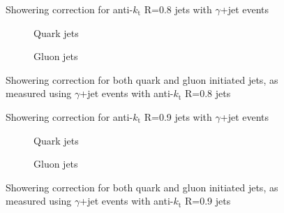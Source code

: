 \clearpage
\begin{figure}[!ht]
 \centering
 \caption[Showering correction for anti-$k_{\mathrm t}$ R=0.8 jets with $\gamma$+jet events]
 {\small Showering correction for anti-$k_{\mathrm t}$ R=0.8 jets with $\gamma$+jet events}
 \label{plot:GJetShowering8App}
\end{figure}

\begin{figure}[!ht]
 \centering
 \begin{subfigure}{.5\textwidth}
  \centering
  \caption{Quark jets}
 \end{subfigure}%
 \begin{subfigure}{.5\textwidth}
  \centering
  \caption{Gluon jets}
 \end{subfigure}
 \caption[Quark/gluon jet showering correction, anti-$k_{\mathrm t}$ R=0.8, $\gamma$+jet]
 {\small Showering correction for both quark and gluon initiated jets, as measured using $\gamma$+jet events with anti-$k_{\mathrm t}$ R=0.8 jets}
 \label{plot:GJetShoweringFlav8App}
\end{figure}

\clearpage
\begin{figure}[!ht]
 \centering
 \caption[Showering correction for anti-$k_{\mathrm t}$ R=0.9 jets with $\gamma$+jet events]
 {\small Showering correction for anti-$k_{\mathrm t}$ R=0.9 jets with $\gamma$+jet events}
 \label{plot:GJetShowering9App}
\end{figure}

\begin{figure}[!ht]
 \centering
 \begin{subfigure}{.5\textwidth}
  \centering
  \caption{Quark jets}
 \end{subfigure}%
 \begin{subfigure}{.5\textwidth}
  \centering
  \caption{Gluon jets}
 \end{subfigure}
 \caption[Quark/gluon jet showering correction, anti-$k_{\mathrm t}$ R=0.9, $\gamma$+jet]
 {\small Showering correction for both quark and gluon initiated jets, as measured using $\gamma$+jet events with anti-$k_{\mathrm t}$ R=0.9 jets}
 \label{plot:GJetShoweringFlav9App}
\end{figure}

